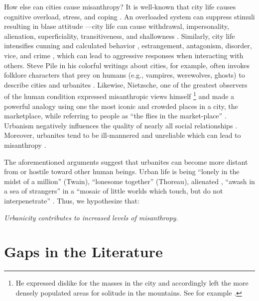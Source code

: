 \documentclass[11pt, letterpaper]{article}
\begin{document}
\begin{spacing}{1.4}
How else can cities cause misanthropy? It is well-known that city life causes cognitive overload, stress, and coping \citep{simmel03, milgram70,lederbogen11}. An overloaded system can suppress stimuli resulting in blase attitude
\citep{simmel03}---city life can cause withdrawal, impersonality, alienation, superficiality, transitiveness, and shallowness \citep{wirth38}. Similarly, city life intensifies cunning and calculated behavior \citep{tonnies57}, estrangement, antagonism, disorder, vice, and crime
\citep{milgram70,park15,park84,bettencourt10b}, which can lead to aggressive responses when interacting with others. Steve Pile in his colorful writings about cities, for example, often invokes folklore characters that prey on humans (e.g., vampires, werewolves, ghosts) to describe cities and urbanites \citep{pile05,pile05B,pile99}. Likewise, Nietzsche, one of the greatest observers of the human condition expressed misanthropic views himself \citep[e.g.,][]{avramenko2004zarathustra}\footnote{He expressed dislike for the masses in the city and accordingly left the more densely populated areas for solitude in the mountains. See for example \citep{nietzsche05}.} and made a powerful analogy using one the most iconic and crowded places in a city, the marketplace, while referring to people as ``the flies in the market-place'' \citep{nietzsche05}. Urbanism negatively influences the quality of nearly all social relationships \citep{wilson85}. Moreover, urbanites tend to be ill-mannered and unreliable which can lead to misanthropy \citep[e.g.,][]{aokCityBook15,aok-sizeFetish17}.

The aforementioned arguments suggest that urbanites can become more distant from or hostile toward other human beings. 
Urban life is being ``lonely in the midst of a million'' (Twain), ``lonesome together''
(Thoreau), alienated \citep{wirth38,nettler1957measure}, ``awash in a sea of strangers''
\citep[Merry cited in][p. 99]{wilson85} in a ``mosaic of little worlds which touch, but do not interpenetrate'' \citep[][p. 40]{park84}. Thus, we hypothesize that:

{\indent\hspace{1in}\textit{Urbanicity contributes to increased levels of misanthropy.}}

\section*{Gaps in the Literature} 


\end{spacing}
\end{document}
